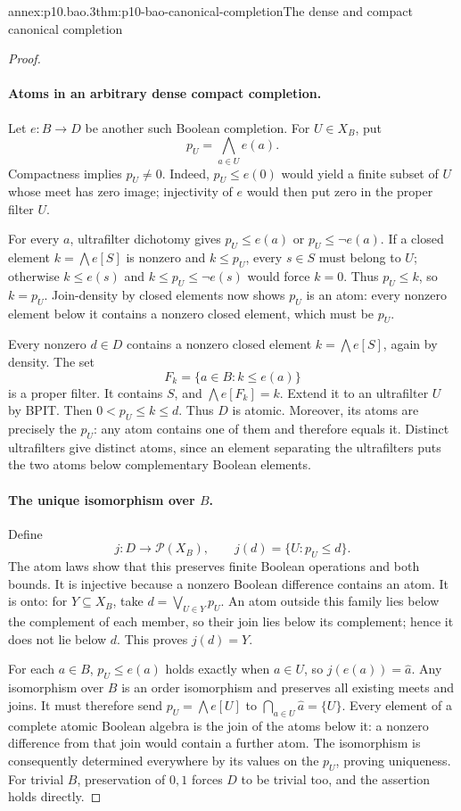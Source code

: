 \begin{annexitem}{annex:p10.bao.3}{thm:p10-bao-canonical-completion}{The dense and compact canonical completion}
\begin{proof}
\paragraph{Atoms in an arbitrary dense compact completion.}
Let \(e:B\to D\) be another such Boolean completion.
For \(U\in X_B\), put
\[
 p_U=\bigwedge_{a\in U}e(a).
\]
Compactness implies \(p_U\ne0\).
Indeed, \(p_U\leq e(0)\) would yield a finite subset of \(U\)
whose meet has zero image; injectivity of \(e\) would then put
zero in the proper filter \(U\).

For every \(a\), ultrafilter dichotomy gives
\(p_U\leq e(a)\) or \(p_U\leq\neg e(a)\).
If a closed element \(k=\bigwedge e[S]\) is nonzero and
\(k\leq p_U\), every \(s\in S\) must belong to \(U\);
otherwise \(k\leq e(s)\) and \(k\leq p_U\leq\neg e(s)\)
would force \(k=0\).
Thus \(p_U\leq k\), so \(k=p_U\).
Join-density by closed elements now shows \(p_U\) is an atom:
every nonzero element below it contains a nonzero closed element,
which must be \(p_U\).

Every nonzero \(d\in D\) contains a nonzero closed element
\(k=\bigwedge e[S]\), again by density.
The set
\[
 F_k=\{a\in B:k\leq e(a)\}
\]
is a proper filter. It contains \(S\), and
\(\bigwedge e[F_k]=k\).
Extend it to an ultrafilter \(U\) by BPIT.
Then \(0<p_U\leq k\leq d\).
Thus \(D\) is atomic.
Moreover, its atoms are precisely the \(p_U\):
any atom contains one of them and therefore equals it.
Distinct ultrafilters give distinct atoms, since an element
separating the ultrafilters puts the two atoms below complementary
Boolean elements.

\paragraph{The unique isomorphism over \(B\).}
Define
\[
 j:D\longrightarrow\mathcal P(X_B),\qquad
 j(d)=\{U:p_U\leq d\}.
\]
The atom laws show that this preserves finite Boolean operations
and both bounds.
It is injective because a nonzero Boolean difference contains
an atom. It is onto: for \(Y\subseteq X_B\), take
\(d=\bigvee_{U\in Y}p_U\).
An atom outside this family lies below the complement of each
member, so their join lies below its complement; hence it does
not lie below \(d\). This proves \(j(d)=Y\).

For each \(a\in B\), \(p_U\leq e(a)\) holds exactly when
\(a\in U\), so \(j(e(a))=\widehat a\).
Any isomorphism over \(B\) is an order isomorphism and preserves
all existing meets and joins.
It must therefore send \(p_U=\bigwedge e[U]\) to
\(\bigcap_{a\in U}\widehat a=\{U\}\).
Every element of a complete atomic Boolean algebra is the join
of the atoms below it: a nonzero difference from that join would
contain a further atom.
The isomorphism is consequently determined everywhere by its
values on the \(p_U\), proving uniqueness.
For trivial \(B\), preservation of \(0,1\) forces \(D\) to be
trivial too, and the assertion holds directly.


\end{proof}
\end{annexitem}

